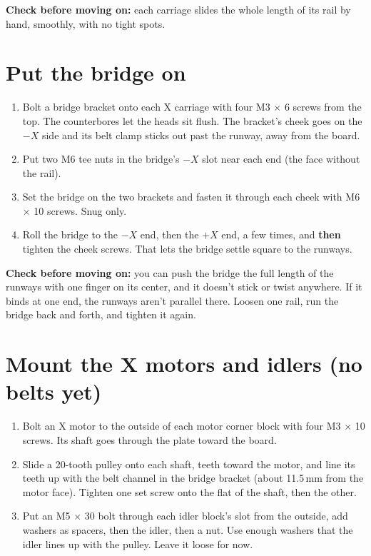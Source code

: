 \documentclass[10pt]{article}
\newcommand{\mm}{\,mm}
\newcommand{\gate}[1]{\par\smallskip\noindent\colorbox{okgreen!10}{\parbox{\dimexpr\linewidth-2\fboxsep}{\textcolor{okgreen}{\textbf{Check before moving on:}} #1}}\par\smallskip}
\begin{document}
\gate{each carriage slides the whole length of its rail by hand, smoothly, with no tight spots.}

\section{Put the bridge on}

\begin{enumerate}
  \item Bolt a bridge bracket onto each X carriage with four M3 $\times$ 6 screws from the top. The
        counterbores let the heads sit flush. The bracket's cheek goes on the $-X$ side and its belt
        clamp sticks out past the runway, away from the board.
  \item Put two M6 tee nuts in the bridge's $-X$ slot near each end (the face without the rail).
  \item Set the bridge on the two brackets and fasten it through each cheek with M6 $\times$ 10
        screws. Snug only.
  \item Roll the bridge to the $-X$ end, then the $+X$ end, a few times, and \textbf{then} tighten
        the cheek screws. That lets the bridge settle square to the runways.
\end{enumerate}

\gate{you can push the bridge the full length of the runways with one finger on its center, and
it doesn't stick or twist anywhere. If it binds at one end, the runways aren't parallel there.
Loosen one rail, run the bridge back and forth, and tighten it again.}

\section{Mount the X motors and idlers (no belts yet)}

\begin{enumerate}
  \item Bolt an X motor to the outside of each motor corner block with four M3 $\times$ 10 screws.
        Its shaft goes through the plate toward the board.
  \item Slide a 20-tooth pulley onto each shaft, teeth toward the motor, and line its teeth up
        with the belt channel in the bridge bracket (about 11.5\mm{} from the motor face). Tighten
        one set screw onto the flat of the shaft, then the other.
  \item Put an M5 $\times$ 30 bolt through each idler block's slot from the outside, add washers as
        spacers, then the idler, then a nut. Use enough washers that the idler lines up with the
        pulley. Leave it loose for now.
\end{enumerate}
\end{document}
